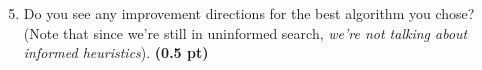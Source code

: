 \documentclass[11pt,a4paper]{../template/report}
\begin{document}
\begin{answer}
\end{answer}

\begin{enumerate}
\setcounter{enumi}{4}
\begin{enumerate}
\setcounter{enumii}{4}
        \item  Do you see any improvement directions for the best algorithm you chose? (Note that since we're still in uninformed search, \textit{we're not talking about informed heuristics}). \textbf{(0.5 pt)}
\end{enumerate}

\end{enumerate}

\begin{answer}
\end{answer}
\end{document}
